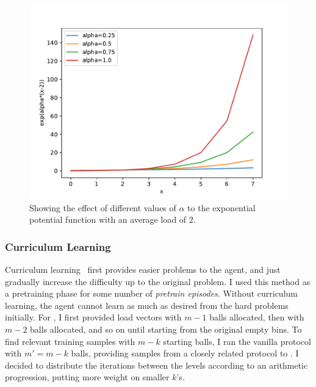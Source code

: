 \begin{figure}[h]
    \centering
    \includegraphics[scale=0.7]{Chapter3/Figs/exponential_potential_analysis.pdf}
    \caption{Showing the effect of different values of $\alpha$ to the exponential potential function with an average load of $2$.}
    \label{exponential-potential-alpha}
\end{figure}



\subsubsection{Curriculum Learning}


Curriculum learning~\cite{bengio2009curriculumoriginal} first provides easier problems to the agent, and just gradually increase the difficulty up to the original problem. I used this method as a pretraining phase for some number of \textit{pretrain episodes}. Without curriculum learning, the agent cannot learn as much as desired from the hard problems initially. For \TwoThinning, I first provided load vectors with $m-1$ balls allocated, then with $m-2$ balls allocated, and so on until starting from the original empty bins. To find relevant training samples with $m-k$ starting balls, I ran the vanilla \OneChoice protocol with $m'=m-k$ balls, providing samples from a closely related protocol to \TwoThinning. I decided to distribute the iterations between the levels according to an arithmetic progression, putting more weight on smaller $k$'s.



